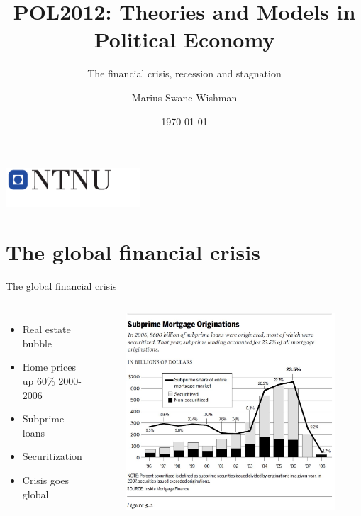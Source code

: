 \documentclass{beamer}
\title[POL2012]{POL2012: Theories and Models in Political Economy}
\subtitle{The financial crisis, recession and stagnation} %
\date{\today}
\author{Marius Swane Wishman}
\institute{Department of Sociology and Political Science}
\begin{document}
\begin{frame}[plain]
\titlepage 
\centering
\includegraphics[width=5cm]{logo_ntnu_u-slagord.pdf} 
\end{frame}

\section{The global financial crisis}

\begin{frame}{The global financial crisis}
\begin{columns}{}
\begin{itemize}
    \item Real estate bubble\pause
    \item Home prices up 60\% 2000-2006\pause
    \item Subprime loans\pause
    \item Securitization\pause
    \item Crisis goes global
\end{itemize}{}
\begin{figure}
    \centering
    \includegraphics[width=\textwidth]{../img/subprime.jpg}
\end{figure}{}
\end{columns}
\end{frame}{}
\end{document}
